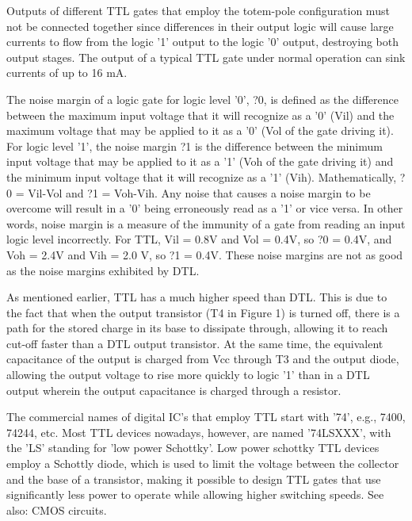 Outputs of different TTL gates that employ the totem-pole configuration must not be connected together since differences in their output logic will cause large currents to flow from the logic '1' output to the logic '0' output, destroying both output stages. The output of a typical TTL gate under normal operation can sink currents of up to 16 mA.



The noise margin of a logic gate for logic level '0', ?0, is defined as the difference between the maximum input voltage that it will recognize as a '0' (Vil) and the maximum voltage that may be applied to it as a '0' (Vol of the gate driving it).  For logic level '1', the noise margin ?1 is the difference between the minimum input voltage that may be applied to it as a '1' (Voh of the gate driving it) and the minimum input voltage that it will recognize as a '1' (Vih).  Mathematically, ?0 = Vil-Vol and ?1 = Voh-Vih.  Any noise that causes a noise margin to be overcome will result in a '0' being erroneously read as a '1' or vice versa.  In other words, noise margin is a measure of the immunity of a gate from reading an input logic level incorrectly.  For TTL, Vil = 0.8V and Vol = 0.4V, so ?0 = 0.4V, and Voh = 2.4V and Vih = 2.0 V, so ?1 = 0.4V.  These noise margins are not as good as the noise margins exhibited by DTL.



As mentioned earlier, TTL has a much higher speed than DTL. This is due to the fact that when the output transistor (T4 in Figure 1) is turned off, there is a path for the stored charge in its base to dissipate through, allowing it to reach cut-off faster than a DTL output transistor.  At the same time, the equivalent capacitance of the output is charged from Vcc through T3 and the output diode, allowing the output voltage to rise more quickly to logic '1' than in a DTL output wherein the output capacitance is charged through a resistor.



The commercial names of digital IC's that employ TTL start with '74', e.g., 7400, 74244, etc. Most TTL devices nowadays, however, are named '74LSXXX', with the 'LS' standing for 'low power Schottky'.  Low power schottky TTL devices employ a Schottly diode, which is used to limit the voltage between the collector and the base of a transistor, making it possible to design TTL gates that use significantly less power to operate while allowing higher switching speeds.  See also:  CMOS circuits.






